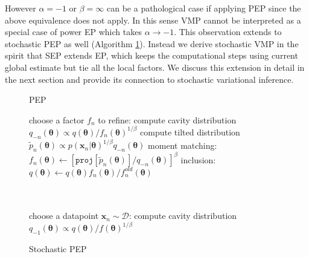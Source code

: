 \documentclass{article} %
\begin{document}
%
However $\alpha = -1$ or $\beta = \infty$ can be a pathological case if applying PEP since the above equivalence does not apply. In this sense VMP cannot be interpreted as a special case of power EP which takes $\alpha \rightarrow -1$. This observation extends to stochastic PEP as well (Algorithm \ref{alg:spep}). Instead we derive stochastic VMP in the spirit that SEP extends EP, which keeps the computational steps using current global estimate but tie all the local factors. We discuss this extension in detail in the next section and provide its connection to stochastic variational inference.

\begin{figure}[!t]
\begin{minipage}[t]{0.45\linewidth}
\centering
\begin{algorithm}[H] 
\caption{PEP} \small
\label{alg:pep} 
\begin{algorithmic}[1] 
	\STATE choose a factor $f_n$ to refine:
	\STATE compute cavity distribution \\$q_{-n}(\bm{\theta}) \propto q(\bm{\theta}) / f_n(\bm{\theta})^{1/\beta}$ 
	\STATE compute tilted distribution \\$\tilde{p}_n(\bm{\theta}) \propto p(\bm{x}_n|\bm{\theta})^{1 / \beta} q_{-n}(\bm{\theta})$
	\STATE moment matching: \\ \hspace{-1mm}$f_n(\bm{\theta}) \leftarrow [\mathtt{proj}[\tilde{p}_n(\bm{\theta})] / q_{-n}(\bm{\theta})]^{\beta} $
	\STATE inclusion:\\ $q(\bm{\theta}) \leftarrow q(\bm{\theta}) f_n(\bm{\theta}) / f_n^{old}(\bm{\theta})$\\
	\hspace{1mm}\\ \vspace{1.5mm} \hspace{1mm}\\
\end{algorithmic}
\end{algorithm}
\end{minipage}
%
\quad
%
\begin{minipage}[t]{0.45\linewidth}
\centering
\begin{algorithm}[H]
\caption{Stochastic PEP} \small
\label{alg:spep} 
\begin{algorithmic}[1] 
	\STATE choose a datapoint $\bm{x}_n\sim \mathcal{D}$:
	\STATE compute cavity distribution \\ $q_{-1}(\bm{\theta}) \propto q(\bm{\theta}) / f(\bm{\theta})^{1/\beta}$

\end{algorithmic}
\end{algorithm}
\end{minipage}
\end{figure}
\end{document}

